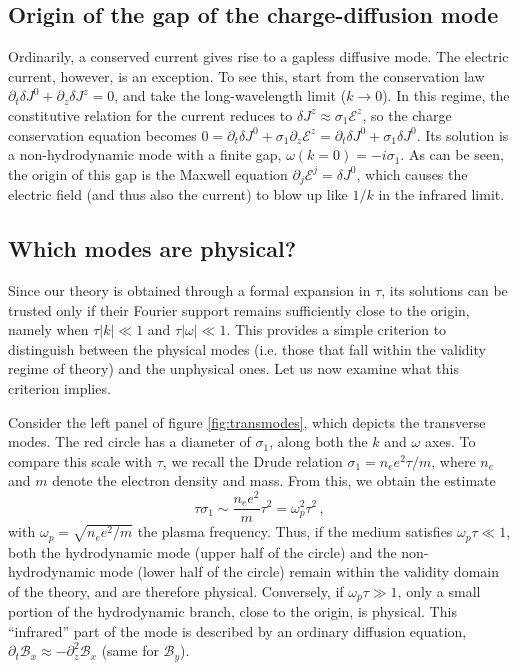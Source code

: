 \documentclass[a4paper, amsfonts, amssymb, amsmath, reprint, showkeys, nofootinbib, twoside,notitlepage]{revtex4-1}
\theoremstyle{definition}
\theoremstyle{theorem}
\begin{document}
\subsection{Origin of the gap of the charge-diffusion mode}

Ordinarily, a conserved current gives rise to a gapless diffusive mode. The electric current, however, is an exception. To see this, start from the conservation law $\partial_t\delta J^0+\partial_z \delta J^z=0$, and take the long-wavelength limit ($k\to 0$). In this regime, the constitutive relation for the current reduces to $\delta J^z \approx \sigma_1 \mathcal{E}^z$, so the charge conservation equation becomes $0=\partial_t\delta J^0+\sigma_1\partial_z \mathcal{E}^z=\partial_t\delta J^0+\sigma_1 \delta J^0$.
Its solution is a non-hydrodynamic mode with a finite gap, $\omega(k{=}0)=-i\sigma_1$. As can be seen, the origin of this gap is the Maxwell equation $\partial_j \mathcal{E}^j=\delta J^0$, which causes the electric field (and thus also the current) to blow up like $1/k$ in the infrared limit.

\subsection{Which modes are physical?}


Since our theory is obtained through a formal expansion in $\tau$, its solutions can be trusted only if their Fourier support remains sufficiently close to the origin, namely when $\tau |k|\ll 1$ and $\tau |\omega|\ll 1$. This provides a simple criterion to distinguish between the physical modes (i.e. those that fall within the validity regime of theory) and the unphysical ones. Let us now examine what this criterion implies.

Consider the left panel of figure \ref{fig:transmodes}, which depicts the transverse modes. The red circle has a diameter of $\sigma_1$, along both the $k$ and $\omega$ axes. To compare this scale with $\tau$, we recall the Drude relation $\sigma_1 = n_e e^2 \tau/m$, where $n_e$ and $m$ denote the electron density and mass. From this, we obtain the estimate
\begin{equation}\label{tausigma}
\tau \sigma_1 \sim \frac{n_e e^2}{m} \tau^2 = \omega_p^2 \tau^2 \, ,
\end{equation}
with $\omega_p = \sqrt{n_e e^2/m}$ the plasma frequency.
Thus, if the medium satisfies $\omega_p \tau \ll 1$, both the hydrodynamic mode (upper half of the circle) and the non-hydrodynamic mode (lower half of the circle) remain within the validity domain of the theory, and are therefore physical. Conversely, if $\omega_p \tau \gg 1$, only a small portion of the hydrodynamic branch, close to the origin, is physical. This “infrared” part of the mode is described by an ordinary diffusion equation, $\partial_t \mathcal{B}_{x}\approx-\partial^2_z\mathcal{B}_{x}$ (same for $\mathcal{B}_y$).
\end{document}
